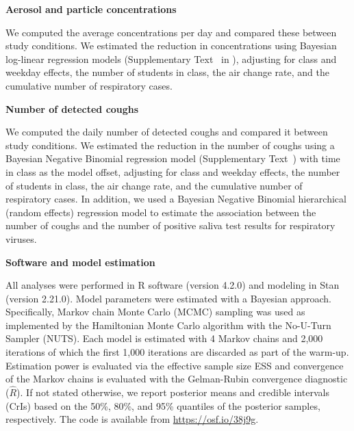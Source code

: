 \documentclass[fleqn,11pt]{wlscirep}
\begin{document}
\noindent\textbf{Aerosol and particle concentrations} \smallskip

\noindent We computed the average concentrations per day and compared these between study conditions. We estimated the reduction in concentrations using Bayesian log-linear regression models (Supplementary Text~ in \supp), adjusting for class and weekday effects, the number of students in class, the air change rate, and the cumulative number of respiratory cases. \medskip

\noindent\textbf{Number of detected coughs} \smallskip

\noindent We computed the daily number of detected coughs and compared it between study conditions. We estimated the reduction in the number of coughs using a Bayesian Negative Binomial regression model (Supplementary Text~) with time in class as the model offset, adjusting for class and weekday effects, the number of students in class, the air change rate, and the cumulative number of respiratory cases. In addition, we used a Bayesian Negative Binomial hierarchical (random effects) regression model to estimate the association between the number of coughs and the number of positive saliva test results for respiratory viruses. \medskip


\noindent\textbf{Software and model estimation} \smallskip

\noindent All analyses were performed in R software (version 4.2.0)\cite{RCoreTeam2022} and modeling in Stan (version 2.21.0)\cite{Carpenter2017}. Model parameters were estimated with a Bayesian approach. Specifically, Markov chain Monte Carlo (MCMC) sampling was used as implemented by the Hamiltonian Monte Carlo algorithm with the No-U-Turn Sampler (NUTS)\cite{Hoffman2014}. Each model is estimated with 4 Markov chains and 2,000 iterations of which the first 1,000 iterations are discarded as part of the warm-up. Estimation power is evaluated via the effective sample size ESS and convergence of the Markov chains is evaluated with the Gelman-Rubin convergence diagnostic ($\hat{R}$). If not stated otherwise, we report posterior means and credible intervals (CrIs) based on the 50\%, 80\%, and 95\% quantiles of the posterior samples, respectively. The code is available from \url{https://osf.io/38j9g}.

\end{document}

